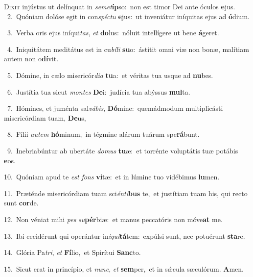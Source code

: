\lettrine{\initial\textcolor{\initialcolor}{D}}{ixit} injústus ut delínquat in \textit{se}\-\textit{met}\textbf{íp}so:~\star non est timor Dei ante óculos \textbf{e}\-jus.\\
{\numbfont\textcolor{\numbcolor}{~2.}}~Quóniam dolóse egit in con\-\textit{spéc}\-\textit{tu} \textbf{e}\-jus:~\star ut inveniátur iníquitas ejus ad \textbf{ó}\-dium.\par
{\numbfont\textcolor{\numbcolor}{~3.}}~Verba oris ejus iníqui\-\textit{tas}\-, \textit{et} \textbf{do}\-lus:~\star nóluit intellígere ut bene \textbf{á}\-geret.\par
{\numbfont\textcolor{\numbcolor}{~4.}}~Iniquitátem meditátus est in cu\-\textit{bí}\-\textit{li} \textbf{su}\-o:~\star ástitit omni viæ non bonæ, malítiam autem non o\-\textbf{dí}\-vit.\par
{\numbfont\textcolor{\numbcolor}{~5.}}~Dómine, in cælo misericór\-\textit{di}\-\textit{a} \textbf{tu}\-a:~\star et véritas tua usque ad \textbf{nu}\-bes.\par
{\numbfont\textcolor{\numbcolor}{~6.}}~Justítia tua sicut \textit{mon}\-\textit{tes} \textbf{De}\-i:~\star judícia tua abýssus \textbf{mul}\-ta.\par
{\numbfont\textcolor{\numbcolor}{~7.}}~Hómines, et juménta sal\-\textit{vá}\-\textit{bis}, \textbf{Dó}\-mine:~\star quemádmodum multiplicásti misericórdiam tuam, \textbf{De}\-us,\par
{\numbfont\textcolor{\numbcolor}{~8.}}~Fílii \textit{au}\-\textit{tem} \textbf{hó}\-minum,~\star in tégmine alárum tuárum spe\-\textbf{rá}\-bunt.\par
{\numbfont\textcolor{\numbcolor}{~9.}}~Inebriabúntur ab ubertáte \textit{do}\-\textit{mus} \textbf{tu}\-æ:~\star et torrénte voluptátis tuæ potábis \textbf{e}\-os.\par
{\numbfont\textcolor{\numbcolor}{10.}}~Quóniam apud te \textit{est} \textit{fons} \textbf{vi}\-tæ:~\star et in lúmine tuo vidébimus \textbf{lu}\-men.\par
{\numbfont\textcolor{\numbcolor}{11.}}~Præténde misericórdiam tuam sci\-\textit{én}\-\textit{ti}\textbf{bus} te,~\star et justítiam tuam his, qui recto sunt \textbf{cor}\-de.\par
{\numbfont\textcolor{\numbcolor}{12.}}~Non véniat mihi \textit{pes} \textit{su}\-\textbf{pér}biæ:~\star et manus peccatóris non móve\textbf{at} me.\par
{\numbfont\textcolor{\numbcolor}{13.}}~Ibi cecidérunt qui operántur in\-\textit{i}\-\textit{qui}\textbf{tá}tem:~\star expúlsi sunt, nec potuérunt \textbf{sta}\-re.\par
{\numbfont\textcolor{\numbcolor}{14.}}~Glória Pa\-\textit{tri}\-, \textit{et} \textbf{Fí}\-lio,~\star et Spirítui \textbf{Sanc}\-to.\par
{\numbfont\textcolor{\numbcolor}{15.}}~Sicut erat in princípio, et \textit{nunc}\-, \textit{et} \textbf{sem}\-per,~\star et in sǽcula sæculórum. \textbf{A}\-men.\par
